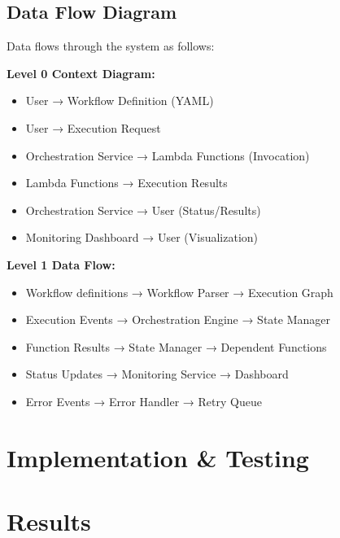 \documentclass{fisatprojectfinal}
\begin{document}
\section{Data Flow Diagram}
Data flows through the system as follows:

\textbf{Level 0 Context Diagram:}
\begin{itemize}
    \item User → Workflow Definition (YAML)
    \item User → Execution Request
    \item Orchestration Service → Lambda Functions (Invocation)
    \item Lambda Functions → Execution Results
    \item Orchestration Service → User (Status/Results)
    \item Monitoring Dashboard → User (Visualization)
\end{itemize}

\textbf{Level 1 Data Flow:}
\begin{itemize}
    \item Workflow definitions → Workflow Parser → Execution Graph
    \item Execution Events → Orchestration Engine → State Manager
    \item Function Results → State Manager → Dependent Functions
    \item Status Updates → Monitoring Service → Dashboard
    \item Error Events → Error Handler → Retry Queue
\end{itemize}


\chapter{Implementation \& Testing}

\chapter{Results}
\end{document}
